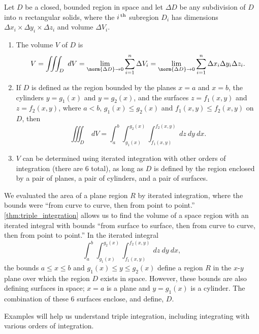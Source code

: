 \setboxwidth{90pt}
{Let $D$ be a closed, bounded region in space and let $\Delta D$ be any subdivision of $D$ into $n$ rectangular solids, where the  $i^\text{\,th}$ subregion $D_i$ has dimensions $\Delta x_i\times\Delta y_i\times\Delta z_i$ and volume $\Delta V_i$.
\begin{enumerate}
	\item	The volume $V$ of $D$ is
	\[V = \iiint_D\ dV = \lim_{\norm{\Delta D}\to0} \sum_{i=1}^n \Delta V_i = \lim_{\norm{\Delta D}\to0} \sum_{i=1}^n \Delta x_i\Delta y_i\Delta z_i.\]

	\item	If $D$ is defined as the region bounded by the planes $x=a$ and $x=b$, the cylinders $y=g_1(x)$ and $y=g_2(x)$, and the surfaces $z=f_1(x,y)$ and $z=f_2(x,y)$, where $a<b$, $g_1(x)\leq g_2(x)$ and $f_1(x,y)\leq f_2(x,y)$ on $D$, then
	\[\iiint_D \ dV = \int_a^b\int_{g_1(x)}^{g_2(x)}\int_{f_1(x,y)}^{f_2(x,y)} \ dz\ dy\ dx.\]

	\item	$V$ can be determined using iterated integration with other orders of integration (there are 6 total), as long as $D$ is defined by the region enclosed by a pair of planes, a pair of cylinders, and a pair of surfaces.
\end{enumerate}}

We evaluated the area of a plane region $R$ by iterated integration, where the bounds were ``from curve to curve, then from point to point.'' \autoref{thm:triple_integration} allows us to find the volume of a space region with an iterated integral with bounds ``from surface to surface, then from curve to curve, then from point to point.'' In the iterated integral 
\[\int_a^b\int_{g_1(x)}^{g_2(x)}\int_{f_1(x,y)}^{f_2(x,y)} \ dz\ dy\ dx,\]
the bounds $a\leq x\leq b$ and $g_1(x)\leq y\leq g_2(x)$ define a region $R$ in the $x$-$y$ plane over which the region $D$ exists in space. However, these bounds are also defining surfaces in space; $x=a$ is a plane and $y=g_1(x)$ is a cylinder. The combination of these 6 surfaces enclose, and define, $D$.


Examples will help us understand triple integration, including integrating with various orders of integration.

